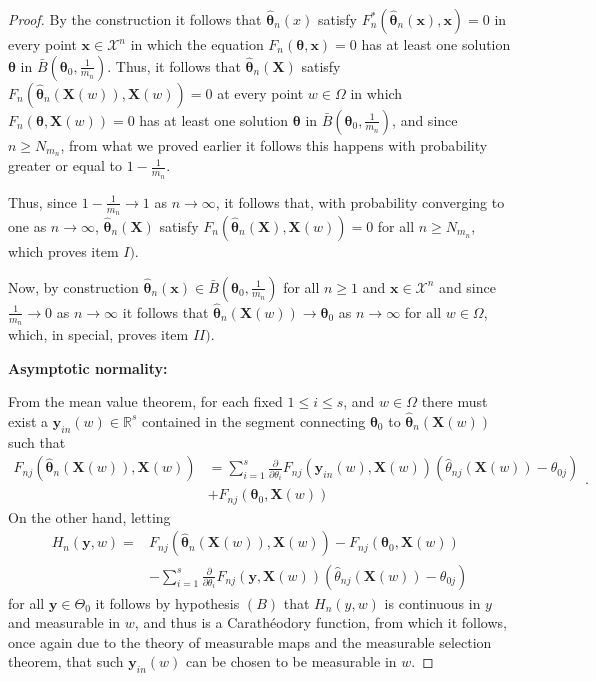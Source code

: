 \documentclass[10pt,a4paper,onecolumn]{article} %
\newcommand{\bs}{\boldsymbol}
\begin{document}
\begin{appendix}
\begin{proof}
By the construction it follows that
$\bs{\hat{\theta}}_n(x)$ satisfy $F^*_n(\bs{\hat{\theta}}_n(\bs{x}),\bs{x})=0$ in every point $\bs{x}\in \mathcal{X}^n$ in which the equation $F_n(\bs{\theta},\bs{x})=0$ has at least one solution $\bs{\theta}$ in $\bar{B}\left(\bs{\theta}_0,\frac{1}{m_n}\right)$.
Thus, it follows that $\bs{\hat{\theta}}_n(\bs{X})$ satisfy $F_n(\bs{\hat{\theta}}_n(\bs{X}(w)),\bs{X}(w))=0$ at every point $w\in \Omega$ in which $F_n(\bs{\theta},\bs{X}(w))=0$ has at least one solution $\bs{\theta}$ in $\bar{B}\left(\bs{\theta}_0,\frac{1}{m_n}\right)$, and since $n\geq N_{m_n}$, from what we proved earlier it follows this happens with probability greater or equal to $1-\frac{1}{m_n}$. 

Thus, since $1-\frac{1}{m_n}\to 1$ as $n\to \infty$, it follows that, with probability converging to one as $n\to \infty$, $\hat{\bs{\theta}}_n(\bs{X})$ satisfy $F_n\left(\bs{\hat{\theta}}_n(\bs{X}),\bs{X}(w)\right)=0$ for all $n\geq N_{m_n}$, which proves item $I)$.

Now, by construction $\bs{\hat{\theta}}_n(\bs{x})\in \bar{B}\left(\bs{\theta}_0,\frac{1}{m_n}\right)$ for all $n\geq 1$ and $\bs{x}\in \mathcal{X}^n$ and since $\frac{1}{m_n}\to 0$ as $n\to \infty$ it follows that $\bs{\hat{\theta}}_n(\bs{X}(w)) \to \bs{\theta}_0$ as $n\to \infty$ for all $w\in \Omega$, which, in special, proves item $II)$.

\noindent\textbf{Asymptotic normality:}
\vspace{0.3cm}

From the mean value theorem, for each fixed $1\leq i\leq s$, and $w\in \Omega$ there must exist a $\bs{y}_{in}(w) \in \mathbb{R}^s$ contained in the segment connecting $\bs{\theta}_0$ to $\bs{\hat{\theta}}_n(\bs{X}(w))$ such that
\begin{equation}\label{eqF_n}
\begin{aligned}
F_{nj}(\bs{\hat{\theta}}_n(\bs{X}(w)),\bs{X}(w)) &=  \sum_{i=1}^s  \frac{\partial}{\partial \theta_i} F_{nj}(\bs{y}_{in}(w),\bs{X}(w)) (\hat{\theta}_{nj}(\bs{X}(w)) - \theta_{0j}) \\ & +F_{nj}(\bs{\theta}_0,\bs{X}(w)) 
\end{aligned}.
\end{equation}
On the other hand, letting
\begin{equation*}
\begin{aligned}
H_n(\bs{y},w) = & F_{nj}(\bs{\hat{\theta}}_n(\bs{X}(w)),\bs{X}(w)) - F_{nj}(\bs{\theta}_0,\bs{X}(w)) \\& - \sum_{i=1}^s  \frac{\partial}{\partial \theta_i} F_{nj}(\bs{y},\bs{X}(w)) (\hat{\theta}_{nj}(\bs{X}(w)) - \theta_{0j})
\end{aligned}
\end{equation*}
for all $\bs{y}\in \Theta_0$
it follows by hypothesis $(B)$ that $H_n(y,w)$ is continuous in $y$ and measurable in $w$, and thus is a Carathéodory function,
from which it follows, once again due to the theory of measurable maps and the measurable selection theorem, that such $\bs{y}_{in}(w)$ can be chosen to be measurable in $w$.


\end{proof}
\end{appendix}
\end{document}
